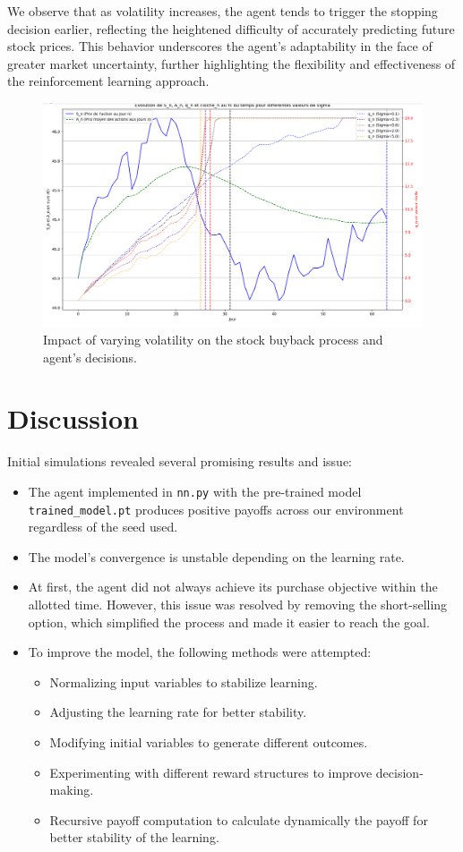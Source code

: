 \documentclass[a4paper, 12pt]{article}
\begin{document}
We observe that as volatility increases, the agent tends to trigger the stopping decision earlier, reflecting the heightened difficulty of accurately predicting future stock prices. This behavior underscores the agent's adaptability in the face of greater market uncertainty, further highlighting the flexibility and effectiveness of the reinforcement learning approach.
\begin{figure}
    \centering
    \includegraphics[width=1\textwidth]{volatilite.png}
    \caption{Impact of varying volatility on the stock buyback process and agent's decisions.}
\end{figure}


\section{Discussion}
Initial simulations revealed several promising results and issue:
\begin{itemize}
    \item The agent implemented in \texttt{nn.py} with the pre-trained model \texttt{trained\_model.pt} produces positive payoffs across our environment regardless of the seed used.
    \item The model's convergence is unstable depending on the learning rate.
    \item At first, the agent did not always achieve its purchase objective within the allotted time. However, this issue was resolved by removing the short-selling option, which simplified the process and made it easier to reach the goal.
    \item To improve the model, the following methods were attempted:
    \begin{itemize}
        \item Normalizing input variables to stabilize learning.
        \item Adjusting the learning rate for better stability.
        \item Modifying initial variables to generate different outcomes.
        \item Experimenting with different reward structures to improve decision-making.
        \item Recursive payoff computation to calculate dynamically the payoff for better stability of the learning.
    \end{itemize}
\end{itemize} 
\end{document}
